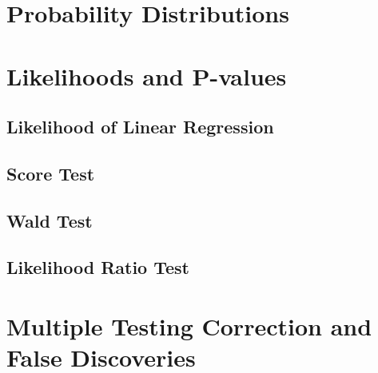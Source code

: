 \documentclass{pset}
\date{6/1/2025}
\begin{document}
\maketitle

\section{Probability Distributions}

\subsection{}

\subsection{}

\subsection{}


\section{Likelihoods and P-values}

\subsection{Likelihood of Linear Regression}

\subsection{Score Test}


\subsection{Wald Test}


\subsection{Likelihood Ratio Test}


\subsection{}


\section{Multiple Testing Correction and False Discoveries}
\end{document}
